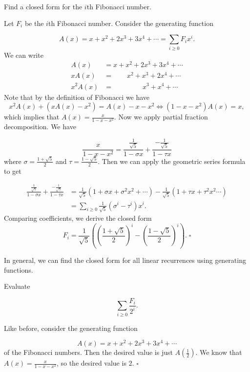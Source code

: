 \documentclass{article}
\begin{document}
\begin{exam}
Find a closed form for the $i$th Fibonacci number.
\end{exam}
\begin{sol}
Let $F_i$ be the $i$th Fibonacci number. Consider the generating function

\[A(x) = x + x^2 + 2x^3 + 3x^4 + \cdots = \sum_{i \ge 0}F_ix^i.\]
We can write
\begin{align*}
A(x) & = x + x^2 + 2x^3 + 3x^4 + \cdots\\
xA(x) & = \qquad x^2 + x^3 + 2x^4 + \cdots\\
x^2A(x) & = \qquad \qquad \; x^3 + x^4 + \cdots
\end{align*}
Note that by the definition of Fibonacci we have \[x^2A(x)+(xA(x)-x^2)=A(x)-x-x^2\iff(1-x-x^2)A(x) = x,\] which implies that $A(x) = \tfrac{x}{1-x-x^2}$. 
Now we apply partial fraction decomposition. We have

\[\frac{x}{1-x-x^2} = \frac{\tfrac{1}{\sqrt{5}}}{1-\sigma x} + \frac{-\tfrac{1}{\sqrt{5}}}{1 - \tau x}\]
where $\sigma = \tfrac{1+\sqrt{5}}{2}$ and $\tau = \tfrac{1-\sqrt{5}}{2}$. Then we can apply the geometric series formula to get

\begin{align*}
\frac{\tfrac{1}{\sqrt{5}}}{1-\sigma x} + \frac{-\tfrac{1}{\sqrt{5}}}{1 - \tau x} & = \frac{1}{\sqrt{5}}(1 + \sigma x + \sigma^2 x^2 + \cdots) - \frac{1}{\sqrt{5}}(1 + \tau x + \tau^2 x^2 \cdots)\\
& = \sum_{i \ge 0} \frac{1}{\sqrt{5}}\left(\sigma^i - \tau^i\right) x^i.
\end{align*}
Comparing coefficients, we derive the closed form
\[F_i = \frac{1}{\sqrt{5}}\left(\left(\frac{1 + \sqrt5}{2}\right)^i - \left(\frac{1-\sqrt5}{2}\right)^i\right). \; \square\]
\end{sol}
\bigskip

In general, we can find the closed form for all linear recurrences using generating functions.

\begin{exam}
Evaluate

\[\sum_{i \ge 0} \frac{F_i}{2^i}.\]
\end{exam}
\begin{sol}
Like before, consider the generating function 

\[A(x) = x + x^2 + 2x^3 + 3x^4 + \cdots\] 
of the Fibonacci numbers. Then the desired value is just $A(\tfrac{1}{2})$. We know that $A(x) = \tfrac{x}{1-x-x^2}$, so the desired value is $2$. $\square$
\end{sol}
\bigskip
\end{document}
